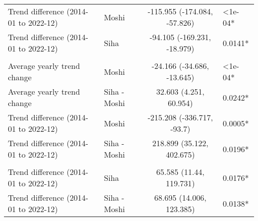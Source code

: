 \begin{longtable}{l|lcl}
Trend difference (2014-01 to 2022-12) & Moshi & -115.955 (-174.084, -57.826) & <1e-04* \\ 
Trend difference (2014-01 to 2022-12) & Siha & -94.105 (-169.231, -18.979) & 0.0141* \\ 
\midrule\addlinespace[2.5pt]
\multicolumn{4}{l}{Diarrhea} \\ 
\midrule\addlinespace[2.5pt]
Average yearly trend change & Moshi & -24.166 (-34.686, -13.645) & <1e-04* \\ 
Average yearly trend change & Siha - Moshi & 32.603 (4.251, 60.954) & 0.0242* \\ 
Trend difference (2014-01 to 2022-12) & Moshi & -215.208 (-336.717, -93.7) & 0.0005* \\ 
Trend difference (2014-01 to 2022-12) & Siha - Moshi & 218.899 (35.122, 402.675) & 0.0196* \\ 
\midrule\addlinespace[2.5pt]
\multicolumn{4}{l}{Neoplasms/Cancer} \\ 
\midrule\addlinespace[2.5pt]
Trend difference (2014-01 to 2022-12) & Siha & 65.585 (11.44, 119.731) & 0.0176* \\ 
Trend difference (2014-01 to 2022-12) & Siha - Moshi & 68.695 (14.006, 123.385) & 0.0138* \\ 
\bottomrule
\end{longtable}

